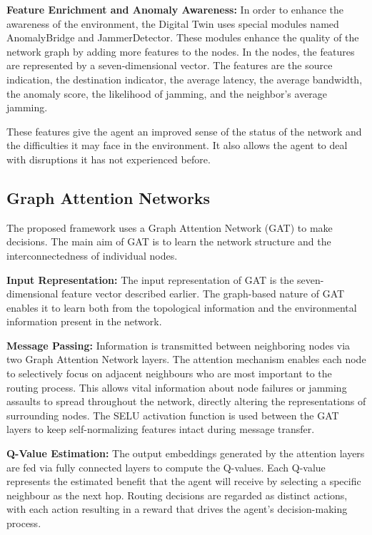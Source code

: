 \documentclass[conference]{IEEEtran}
\begin{document}
\textbf{Feature Enrichment and Anomaly Awareness:} In order to enhance the awareness of the environment, the Digital Twin uses special modules named AnomalyBridge and JammerDetector. These modules enhance the quality of the network graph by adding more features to the nodes. In the nodes, the features are represented by a seven-dimensional vector. The features are the source indication, the destination indicator, the average latency, the average bandwidth, the anomaly score, the likelihood of jamming, and the neighbor's average jamming.

These features give the agent an improved sense of the status of the network and the difficulties it may face in the environment. It also allows the agent to deal with disruptions it has not experienced before.

\subsection{Graph Attention Networks}

The proposed framework uses a Graph Attention Network (GAT) to make decisions. The main aim of GAT is to learn the network structure and the interconnectedness of individual nodes.


\textbf{Input Representation:} The input representation of GAT is the seven-dimensional feature vector described earlier. The graph-based nature of GAT enables it to learn both from the topological information and the environmental information present in the network.

\textbf{Message Passing:} Information is transmitted between neighboring nodes via two Graph Attention Network layers. The attention mechanism enables each node to selectively focus on adjacent neighbours who are most important to the routing process. This allows vital information about node failures or jamming assaults to spread throughout the network, directly altering the representations of surrounding nodes. The SELU activation function is used between the GAT layers to keep self-normalizing features intact during message transfer.

\textbf{Q-Value Estimation:} The output embeddings generated by the attention layers are fed via fully connected layers to compute the Q-values. Each Q-value represents the estimated benefit that the agent will receive by selecting a specific neighbour as the next hop. Routing decisions are regarded as distinct actions, with each action resulting in a reward that drives the agent's decision-making process.
\end{document}
